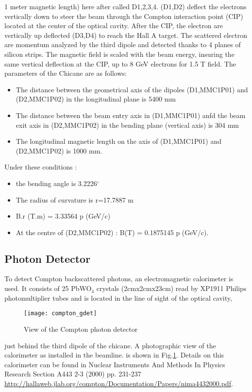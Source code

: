 {1 meter magnetic length) here after called D1,2,3,4.
(D1,D2) deflect  the electrons  vertically down to steer
the beam through the Compton interaction point (CIP) located at the center of
the optical cavity. After the CIP, the electron are vertically up deflected (D3,D4) to reach
the Hall A target. The scattered electron are momentum analyzed by the third dipole and
detected thanks to 4 planes of silicon strips.
The magnetic field is scaled with the beam energy, insuring the same vertical deflection at the CIP,
up to 8 GeV electrons for 1.5 T field. The parameters of the Chicane are as follows:
\begin{itemize}
\item The distance between the geometrical axis of the
        dipoles (D1,MMC1P01) and (D2,MMC1P02) in the longitudinal plane is 5400 mm
	\item The distance between the beam entry axis in (D1,MMC1P01) anfd the
        beam exit axis in (D2,MMC1P02) in the bending plane (vertical axis) is 304 mm
	\item The longitudinal magnetic length on the axis of (D1,MMC1P01) and
	(D2,MMC1P02) is 1000 mm.
\end{itemize}

\par Under these conditions :
\begin{itemize}
    \item the bending angle is 3.2226$^{\circ}$
    \item The radius of curvature is r=17.7887 m
    \item B.r (T.m) = 3.33564 p (GeV/c)
    \item At the centre of (D2,MMC1P02) : B(T) = 0.1875145 p (GeV/c).
\end{itemize}

\subsection{Photon Detector}
To detect Compton backscattered photons, an electromagnetic
calorimeter is used. It consists of 25 PbWO$_4$ crystals (2cmx2cmx23cm) read by XP1911
Philips photomultiplier tubes and is located in the line of sight of the optical cavity,
\label{sec:compton_gdet}
\begin{figure}[htp]
    \begin{center}
        \texttt{[image: compton\_gdet]}
    \end{center}
    \caption[compton:photon detector]{
            View of the Compton photon detector
            }
    \label{fig:compton_gdet}
 \end{figure}
just behind the third  dipole of the chicane.
 A photographic view of the calorimeter as installed in the beamline.
 is shown in Fig.\ref{fig:compton_gdet}. 
Details on this calorimeter can be found
in  Nuclear Instruments And Methods In Physics Research Section A443 2-3 (2000) pp. 231-237
\url{http://hallaweb.jlab.org/compton/Documentation/Papers/nima4432000.pdf}.

}
